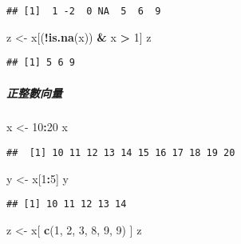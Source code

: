 \documentclass[
]{article}
\newenvironment{Shaded}{\begin{snugshade}}{\end{snugshade}}
\newcommand{\DecValTok}[1]{\textcolor[rgb]{0.00,0.00,0.81}{#1}}
\newcommand{\KeywordTok}[1]{\textcolor[rgb]{0.13,0.29,0.53}{\textbf{#1}}}
\newcommand{\NormalTok}[1]{#1}
\newcommand{\OperatorTok}[1]{\textcolor[rgb]{0.81,0.36,0.00}{\textbf{#1}}}
\newcommand{\StringTok}[1]{\textcolor[rgb]{0.31,0.60,0.02}{#1}}
\begin{document}
\begin{verbatim}
## [1]  1 -2  0 NA  5  6  9
\end{verbatim}

\begin{Shaded}
\begin{Highlighting}[]
\NormalTok{z <-}\StringTok{ }\NormalTok{x[(}\OperatorTok{!}\KeywordTok{is.na}\NormalTok{(x)) }\OperatorTok{&}\StringTok{ }\NormalTok{x }\OperatorTok{>}\StringTok{ }\DecValTok{1}\NormalTok{]}
\NormalTok{z}
\end{Highlighting}
\end{Shaded}

\begin{verbatim}
## [1] 5 6 9
\end{verbatim}

\hypertarget{ux6b63ux6574ux6578ux5411ux91cf}{%
\subparagraph{正整數向量}\label{ux6b63ux6574ux6578ux5411ux91cf}}

\begin{Shaded}
\begin{Highlighting}[]
\NormalTok{x <-}\StringTok{ }\DecValTok{10}\OperatorTok{:}\DecValTok{20}
\NormalTok{x}
\end{Highlighting}
\end{Shaded}

\begin{verbatim}
##  [1] 10 11 12 13 14 15 16 17 18 19 20
\end{verbatim}

\begin{Shaded}
\begin{Highlighting}[]
\NormalTok{y <-}\StringTok{ }\NormalTok{x[}\DecValTok{1}\OperatorTok{:}\DecValTok{5}\NormalTok{]}
\NormalTok{y}
\end{Highlighting}
\end{Shaded}

\begin{verbatim}
## [1] 10 11 12 13 14
\end{verbatim}

\begin{Shaded}
\begin{Highlighting}[]
\NormalTok{z <-}\StringTok{ }\NormalTok{x[ }\KeywordTok{c}\NormalTok{(}\DecValTok{1}\NormalTok{, }\DecValTok{2}\NormalTok{, }\DecValTok{3}\NormalTok{, }\DecValTok{8}\NormalTok{, }\DecValTok{9}\NormalTok{, }\DecValTok{9}\NormalTok{) ]}
\NormalTok{z}
\end{Highlighting}
\end{Shaded}
\end{document}
